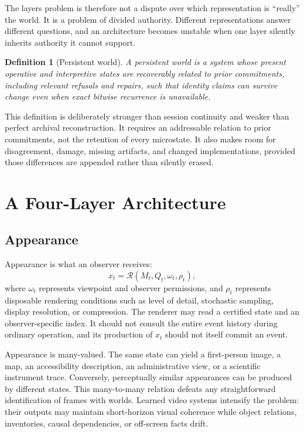\documentclass[11pt]{article}
\newtheorem{definition}{Definition}
\newcommand{\Render}{\mathcal{R}}
\begin{document}
The layers problem is therefore not a dispute over which representation is ``really'' the world. It is a problem of divided authority. Different representations answer different questions, and an architecture becomes unstable when one layer silently inherits authority it cannot support.

\begin{definition}[Persistent world]
A persistent world is a system whose present operative and interpretive states are recoverably related to prior commitments, including relevant refusals and repairs, such that identity claims can survive change even when exact bitwise recurrence is unavailable.
\end{definition}

This definition is deliberately stronger than session continuity and weaker than perfect archival reconstruction. It requires an addressable relation to prior commitments, not the retention of every microstate. It also makes room for disagreement, damage, missing artifacts, and changed implementations, provided those differences are appended rather than silently erased.

\section{A Four-Layer Architecture}

\subsection{Appearance}

Appearance is what an observer receives:
\[
x_t = \Render(M_t,Q_t,\omega_t,\rho_t),
\]
where $\omega_t$ represents viewpoint and observer permissions, and $\rho_t$ represents disposable rendering conditions such as level of detail, stochastic sampling, display resolution, or compression. The renderer may read a certified state and an observer-specific index. It should not consult the entire event history during ordinary operation, and its production of $x_t$ should not itself commit an event.

Appearance is many-valued. The same state can yield a first-person image, a map, an accessibility description, an administrative view, or a scientific instrument trace. Conversely, perceptually similar appearances can be produced by different states. This many-to-many relation defeats any straightforward identification of frames with worlds. Learned video systems intensify the problem: their outputs may maintain short-horizon visual coherence while object relations, inventories, causal dependencies, or off-screen facts drift.
\end{document}
